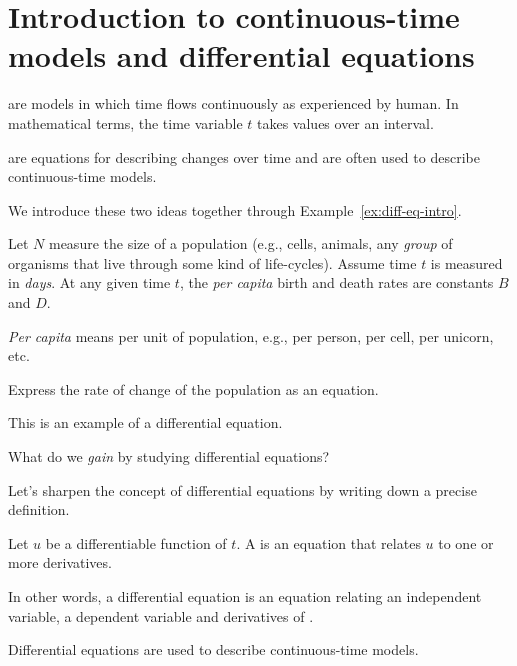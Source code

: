 \documentclass[../main.tex]{subfiles}
\begin{document}
 \section{Introduction to continuous-time models and differential equations}

 are models in which time flows continuously as experienced by human. In mathematical terms, the time variable \(t\) takes values over an interval. 

 are equations for describing changes over time and are often used to describe continuous-time models.

We introduce these two ideas together through Example~\ref{ex:diff-eq-intro}.

\begin{example} \label{ex:diff-eq-intro}
  Let \(N\) measure the size of a population (e.g., cells, animals, any \emph{group} of organisms that live through some kind of life-cycles). Assume time \(t\) is measured in \emph{days}. At any given time \(t\), the \emph{per capita} birth and death rates are constants \(B\) and \(D\).  

  \emph{Per capita} means per unit of population, e.g., per person, per cell, per unicorn, etc.

  Express the rate of change of the population  as an equation.  

  This is an example of a differential equation.

  What do we \emph{gain} by studying differential equations?
\end{example}

\clearpage
Let's sharpen the concept of differential equations by writing down a precise definition.
\begin{definition}
  Let \(u\) be a differentiable function of \(t\). A  is an equation that relates \(u\) to one or more derivatives. 

  In other words, a differential equation is an equation relating an independent variable, a dependent variable and derivatives of \underline{\hspace{3in}}.

  \faExclamationTriangle{} Differential equations are used to describe continuous-time models.
\end{definition}
\end{document}
